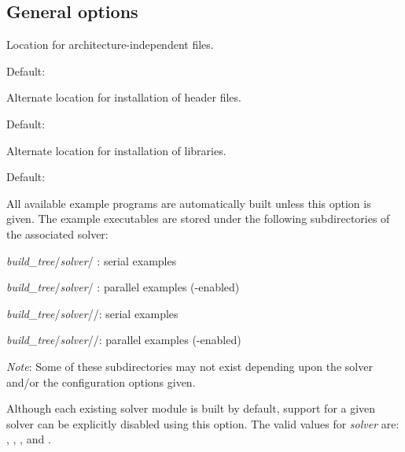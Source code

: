 \subsection*{General options}


\begin{config}
  
\item {}
  
  Location for architecture-independent files.
  
  Default: 
  
\item {}
  
  Alternate location for installation of header files.
  
  Default: 
  
\item {}
  
  Alternate location for installation of libraries.
  
  Default: 

\item {}
  
  All available example programs are automatically built unless this option is
  given. The example executables are stored under the following subdirectories
  of the associated solver: 
  
  \begin{config}
  \item {\em build\_tree}/{\em solver}/ : serial {\C} examples
  \item {\em build\_tree}/{\em solver}/ : parallel {\C} examples
        ({\mpi}-enabled)
  \item {\em build\_tree}/{\em solver}//: serial {\F}
        examples
  \item {\em build\_tree}/{\em solver}//: parallel {\F}
        examples ({\mpi}-enabled)
  \end{config}
  
  {\em Note}: Some of these subdirectories may not exist depending upon the
  solver and/or the configuration options given.
  
\item {}

  Although each existing solver module is built by default, support for a
  given solver can be explicitly disabled using this option. 
  The valid values for {\em solver} are: , , 
  , and .
  

\end{config}
